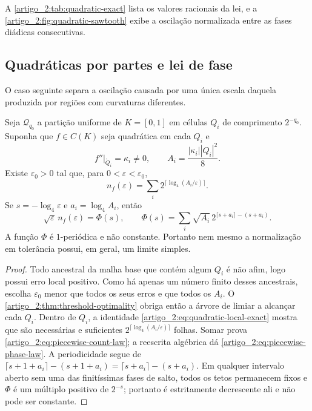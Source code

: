 A \cref{artigo_2:tab:quadratic-exact} lista os valores racionais da lei, e a
\cref{artigo_2:fig:quadratic-sawtooth} exibe a oscilação normalizada entre as fases
diádicas consecutivas.

\subsection{Quadráticas por partes e lei de fase}

O caso seguinte separa a oscilação causada por uma única escala daquela
produzida por regiões com curvaturas diferentes.

\begin{theorem}\label{map:artigo_2:12.2}
\label{artigo_2:thm:piecewise-quadratic-count}
Seja $\mathcal Q_{q_0}$ a partição uniforme de $K=[0,1]$ em células
$Q_i$ de comprimento $2^{-q_0}$. Suponha que $f\in C(K)$ seja quadrática
em cada $Q_i$ e
\[
 f''|_{\mathring Q_i}=\kappa_i\ne0,
 \qquad
 A_i=\frac{|\kappa_i||Q_i|^2}{8}.
\]
Existe $\varepsilon_0>0$ tal que, para
$0<\varepsilon<\varepsilon_0$,
\begin{equation}
 n_f(\varepsilon)
 =\sum_i2^{\lceil\log_4(A_i/\varepsilon)\rceil}.
 \label{artigo_2:eq:piecewise-count-law}
\end{equation}
Se $s=-\log_4\varepsilon$ e $a_i=\log_4A_i$, então
\begin{equation}
 \sqrt\varepsilon\,n_f(\varepsilon)
 =\Phi(s),
 \qquad
 \Phi(s)=\sum_i\sqrt{A_i}\,
 2^{\lceil s+a_i\rceil-(s+a_i)}.
 \label{artigo_2:eq:piecewise-phase-law}
\end{equation}
A função $\Phi$ é $1$-periódica e não constante. Portanto nem mesmo a
normalização em tolerância possui, em geral, um limite simples.
\end{theorem}

\begin{proof}
Todo ancestral da malha base que contém algum $Q_i$ é não afim, logo possui
erro local positivo. Como há apenas um número finito desses ancestrais,
escolha $\varepsilon_0$ menor que todos os seus erros e que todos os $A_i$.
O \cref{artigo_2:thm:threshold-optimality} obriga então a árvore de limiar a alcançar
cada $Q_i$. Dentro de $Q_i$, a identidade
\eqref{artigo_2:eq:quadratic-local-exact} mostra que são necessárias e suficientes
$2^{\lceil\log_4(A_i/\varepsilon)\rceil}$ folhas. Somar prova
\eqref{artigo_2:eq:piecewise-count-law}; a reescrita algébrica dá
\eqref{artigo_2:eq:piecewise-phase-law}. A periodicidade segue de
$\lceil s+1+a_i\rceil-(s+1+a_i)=\lceil s+a_i\rceil-(s+a_i)$.
Em qualquer intervalo aberto sem uma das finitíssimas fases de salto, todos
os tetos permanecem fixos e $\Phi$ é um múltiplo positivo de $2^{-s}$;
portanto é estritamente decrescente ali e não pode ser constante.
\end{proof}

